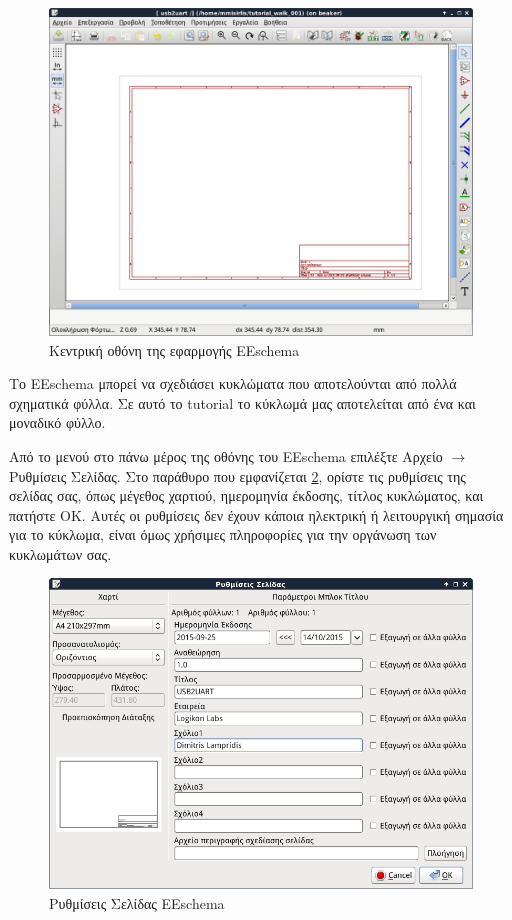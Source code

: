 \documentclass[a4paper]{article}
\begin{document}
\begin{figure}
  \begin{center}
    \includegraphics[width=.9\textwidth]{img/eesch-main-window.png}
    \caption{Κεντρική οθόνη της εφαρμογής \textenglish{EEschema}}
    \label{fig:eesch-main-window}
  \end{center}
\end{figure}

Το \textenglish{EEschema} μπορεί να σχεδιάσει κυκλώματα που αποτελούνται από πολλά σχηματικά φύλλα. Σε αυτό το tutorial το κύκλωμά μας αποτελείται από ένα και μοναδικό φύλλο.

Από το μενού στο πάνω μέρος της οθόνης του \textenglish{EEschema} επιλέξτε Αρχείο $\rightarrow$ Ρυθμίσεις Σελίδας. Στο παράθυρο που εμφανίζεται \ref{fig:eesch-dial-pagesett}, ορίστε τις ρυθμίσεις της σελίδας σας, όπως μέγεθος χαρτιού, ημερομηνία έκδοσης, τίτλος κυκλώματος, και πατήστε ΟΚ. Αυτές οι ρυθμίσεις δεν έχουν κάποια ηλεκτρική ή λειτουργική σημασία για το κύκλωμα, είναι όμως χρήσιμες πληροφορίες για την οργάνωση των κυκλωμάτων σας.

\begin{figure}
  \begin{center}
    \includegraphics[width=.9\textwidth]{img/eesch-dial-pagesett.png}
    \caption{Ρυθμίσεις Σελίδας \textenglish{EEschema}}
    \label{fig:eesch-dial-pagesett}
  \end{center}
\end{figure}
\end{document}
